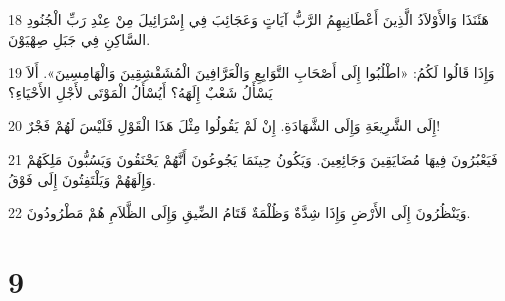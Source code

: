 \par 18 هَئَنَذَا وَالأَوْلاَدُ الَّذِينَ أَعْطَانِيهِمُ الرَّبُّ آيَاتٍ وَعَجَائِبَ فِي إِسْرَائِيلَ مِنْ عِنْدِ رَبِّ الْجُنُودِ السَّاكِنِ فِي جَبَلِ صِهْيَوْنَ.
\par 19 وَإِذَا قَالُوا لَكُمُ: «اطْلُبُوا إِلَى أَصْحَابِ التَّوَابِعِ وَالْعَرَّافِينَ الْمُشَقْشِقِينَ وَالْهَامِسِينَ». أَلاَ يَسْأَلُ شَعْبٌ إِلَهَهُ؟ أَيُسْأَلُ الْمَوْتَى لأَجْلِ الأَحْيَاءِ؟
\par 20 إِلَى الشَّرِيعَةِ وَإِلَى الشَّهَادَةِ. إِنْ لَمْ يَقُولُوا مِثْلَ هَذَا الْقَوْلِ فَلَيْسَ لَهُمْ فَجْرٌ!
\par 21 فَيَعْبُرُونَ فِيهَا مُضَايَقِينَ وَجَائِعِينَ. وَيَكُونُ حِينَمَا يَجُوعُونَ أَنَّهُمْ يَحْنَقُونَ وَيَسُبُّونَ مَلِكَهُمْ وَإِلَهَهُمْ وَيَلْتَفِتُونَ إِلَى فَوْقُ.
\par 22 وَيَنْظُرُونَ إِلَى الأَرْضِ وَإِذَا شِدَّةٌ وَظُلْمَةٌ قَتَامُ الضِّيقِ وَإِلَى الظَّلاَمِ هُمْ مَطْرُودُونَ.

\chapter{9}


